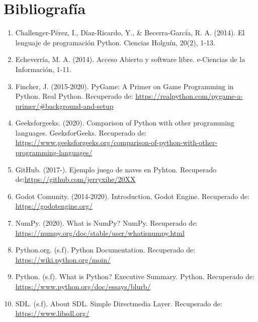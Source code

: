 \documentclass[12pt,letterpaper]{article}
\begin{document}
\section{Bibliografía} 
\begin{enumerate}
\item Challenger-Pérez, I., Díaz-Ricardo, Y., \& Becerra-García, R. A. (2014). El lenguaje de programación Python. Ciencias Holguín, 20(2), 1-13.

\item Echeverría, M. A. (2014). Acceso Abierto y software libre. e-Ciencias de la Información, 1-11.

\item Fincher, J. (2015-2020). PyGame: A Primer on Game Programming in Python. Real Python. Recuperado de: \url{https://realpython.com/pygame-a-primer/\#background-and-setup}

\item Geeksforgeeks. (2020). Comparison of Python with other programming languages. GeeksforGeeks. Recuperado de: \url{https://www.geeksforgeeks.org/comparison-of-python-with-other-programming-languages/}

\item GitHub. (2017-). Ejemplo juego de naves en Pyhton. Recuperado de:\url{https://github.com/jerryxihe/20XX}

\item Godot Comunity. (2014-2020). Introduction. Godot Engine. Recuperado de: \url{https://godotengine.org/}

\item NumPy. (2020). What is NumPy? NumPy. Recuperado de: \url{https://numpy.org/doc/stable/user/whatisnumpy.html}

\item Python.org. (s.f). Python Documentation. Recuperado de: \url{https://wiki.python.org/moin/}

\item Python. (s.f). What is Python? Executive Summary. Python. Recuperado de: \url{https://www.python.org/doc/essays/blurb/}

\item SDL. (s.f). About SDL. Simple Directmedia Layer. Recuperado de: \url{https://www.libsdl.org/}

\end{enumerate}
\end{document}
